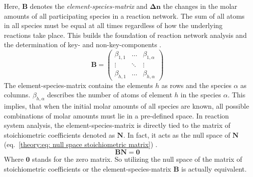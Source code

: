 \noindent
Here, $\bm{B}$ denotes the \emph{element-species-matrix} and $\bm{\Delta n}$ the changes in the molar amounts of all participating
species in a reaction network. The sum of all atoms in all species must be equal at all times regardless of how the underlying reactions take place.
This builds the foundation of reaction network analysis and the determination of key- and non-key-components \cite{guttel2021}.
\begin{equation}
    \label{theory:eq: element-species-matrix}
    \bm{B} = \begin{pmatrix}
        \beta_{1, 1} & \hdots & \beta_{1, \alpha} \\
        \vdots       & \ddots & \vdots \\ 
        \beta_{h, 1} & \hdots & \beta_{h, \alpha}
    \end{pmatrix}   
\end{equation}
The element-species-matrix contains the elements $h$ as rows and the species $\alpha$ as columns. $\beta_{h, \alpha}$ describes
the number of atoms of element $h$ in the species $\alpha$. This implies, that when the initial molar amounts of all species are known,
all possible combinations of molar amounts must lie in a pre-defined space.
In reaction system analysis, the element-species-matrix is directly tied to the matrix
of stoichiometric coefficients denoted as $\bm{N}$. In fact, it acts as the null space of $\bm{N}$
(eq.~\ref{theory:eq: null space stoichiometric matrix}) \cite{guttel2021} .
\begin{equation}
    \label{theory:eq: null space stoichiometric matrix}
    \bm{B}\bm{N} = \bm{0}
\end{equation}
Where $\bm{0}$ stands for the zero matrix. So utilizing the null space of the matrix of stoichiometric
coefficients or the element-species-matrix $\bm{B}$ is actually equivalent.

